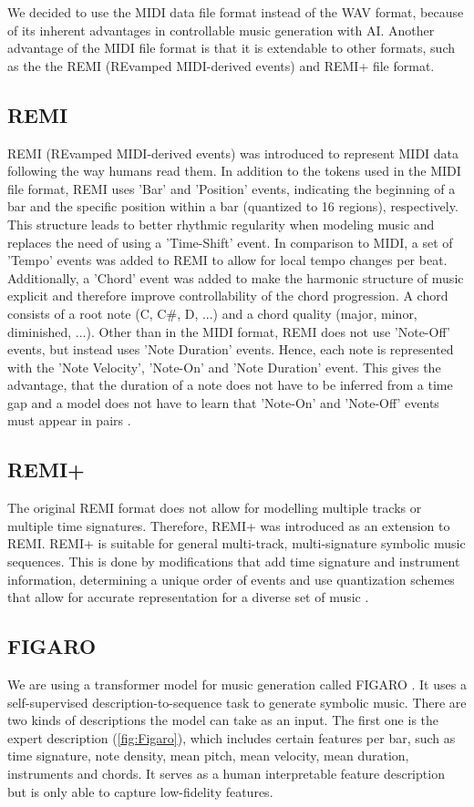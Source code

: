 \documentclass{article}
\begin{document}
We decided to use the MIDI data file format instead of the WAV format, because of its inherent advantages in controllable music generation with AI. Another advantage of the MIDI file format is that it is extendable to other formats, such as the the REMI (REvamped MIDI-derived events) \cite{DBLP:journals/corr/abs-2002-00212} and REMI+ \cite{von2022figaro} file format.

\subsection{REMI}
REMI (REvamped MIDI-derived events) was introduced to represent MIDI data following the way humans read them. In addition to the tokens used in the MIDI file format, REMI uses 'Bar' and 'Position' events, indicating the beginning of a bar and the specific position within a bar (quantized to 16 regions), respectively. This structure leads to better rhythmic regularity when modeling music and replaces the need of using a 'Time-Shift' event. In comparison to MIDI, a set of 'Tempo' events was added to REMI to allow for local tempo changes per beat. Additionally, a 'Chord' event was added to make the harmonic structure of music explicit and therefore improve controllability of the chord progression. A chord consists of a root note (C, C\#, D, ...) and a chord quality (major, minor, diminished, ...). Other than in the MIDI format, REMI does not use 'Note-Off' events, but instead uses 'Note Duration' events. Hence, each note is represented with the 'Note Velocity', 'Note-On' and 'Note Duration' event. This gives the advantage, that the duration of a note does not have to be inferred from a time gap and a model does not have to learn that 'Note-On' and 'Note-Off' events must appear in pairs \cite{DBLP:journals/corr/abs-2002-00212}.

\subsection{REMI+}
The original REMI format does not allow for modelling multiple tracks or multiple time signatures. Therefore, REMI+ was introduced as an extension to REMI. REMI+ is suitable for general multi-track, multi-signature symbolic music sequences. This is done by modifications that add time signature and instrument information, determining a unique order of events and use quantization schemes that allow for accurate representation for a diverse set of music \cite{von2022figaro}.

\subsection{FIGARO}
We are using a transformer model for music generation called FIGARO \cite{von2022figaro}. It uses a self-supervised description-to-sequence task to generate symbolic music. There are two kinds of descriptions the model can take as an input. The first one is the expert description (\cref{fig:Figaro}), which includes certain features per bar, such as time signature, note density, mean pitch, mean velocity, mean duration, instruments and chords. It serves as a human interpretable feature description but is only able to capture low-fidelity features.  
\end{document}
